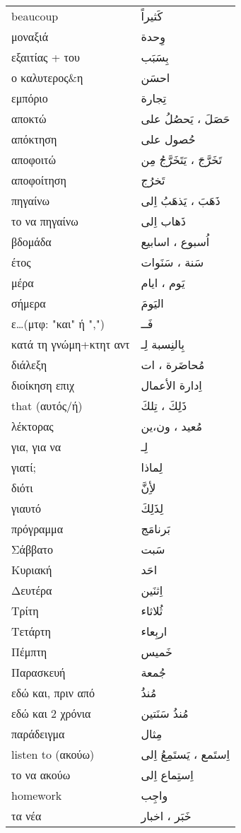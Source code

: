 \documentclass[twocolumn,a4paper]{article}
\newcommand{\ar}[1]{\textarabic{#1}}
\newcommand{\pl}{\raisebox{0.15ex}{\footnotesize ◍}}
\newcommand{\normpl}[1]{\ar{ #1، ات }}
\newcommand{\mfnormpl}[1]{\ar{ #1، ون،ين }}
\newcommand{\vrf}{\raisebox{0.15ex}{\footnotesize ◉}}
\newcommand{\mas}{\raisebox{0.15ex}{\footnotesize ◫}}
\begin{document}
\begin{mpsupertabular}{ P{0.5\textwidth} P{0.5\textwidth} }
beaucoup       & \ar{ كَثيراً } \\
μοναξιά        & \ar{ وِحدة } \\
εξαιτίας + του & \ar{ بِسَبَب } \\
ο καλυτερος\&η & \ar{ احسَن } \\
εμπόριο        & \ar{ تِجارة } \\
αποκτώ \vrf    & \ar{ حَصَلَ ، يَحصُلُ على } \\
απόκτηση       & \ar{ حُصول على } \\
αποφοιτώ \vrf  & \ar{ تَخَرَّجَ ، يَتَخَرَّجُ مِن } \\
αποφοίτηση \mas & \ar{ تَخرُج } \\
πηγαίνω \vrf   & \ar{ ذَهَبَ ، يَذهَبُ اِلى } \\
το να πηγαίνω \mas & \ar{ ذَهاب اِلى } \\
βδομάδα \pl    & \ar{ اُسبوع ، اسابيع } \\
έτος \pl       & \ar{ سَنة ، سَنَوات } \\
μέρα \pl       & \ar{ يَوم ، ايام } \\
σήμερα         & \ar{ اليَومَ } \\
ε\ldots (μτφ: "και" ή ",") & \ar{ فَــ } \\
κατά τη γνώμη+κτητ αντ & \ar{ بِالنِسبة لِـ } \\
διάλεξη \pl    & \normpl{ مُحاضَرة } \\
διοίκηση επιχ  & \ar{ اِدارة اﻷعمال } \\
that (αυτός/ή) & \ar{ ذَلِكَ ، تِلكَ } \\
λέκτορας \pl   & \mfnormpl{ مُعيد } \\
για, για να     & \ar{ لِـ } \\
γιατί;         & \ar{ لِماذا } \\
διότι          & \ar{ ﻷِنَّ } \\  %
γιαυτό         & \ar{ لِذَلِكَ } \\
πρόγραμμα      & \ar{ بَرنامَج } \\
Σάββατο        & \ar{ سَبت } \\
Κυριακή        & \ar{ احَد } \\
Δευτέρα        & \ar{ اِثنَين } \\
Τρίτη          & \ar{ ثُلاثاء } \\
Τετάρτη        & \ar{ اربِعاء } \\
Πέμπτη         & \ar{ خَميس } \\
Παρασκευή      & \ar{ جُمعة } \\
εδώ και, πριν από & \ar{ مُنذُ } \\
εδώ και 2 χρόνια & \ar{ مُنذُ سَنَتين } \\
παράδειγμα     & \ar{ مِثال } \\
listen to (ακούω) \vrf & \ar{ اِستَمع ، يَستَمِعُ اِلى } \\
το να ακούω \mas & \ar{ اِستِماع اِلى  } \\
homework       & \ar{ واجِب } \\
τα νέα \pl     & \ar{ خَبَر ، اخبار } \\


\end{mpsupertabular}
\end{document}
